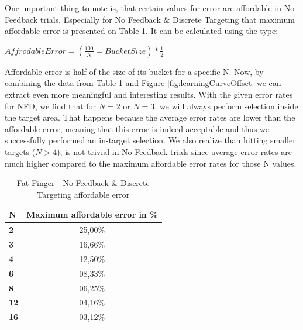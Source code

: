 One important thing to note is, that certain values for error are affordable in No Feedback trials. Especially for No Feedback \& Discrete Targeting that maximum affordable error is presented on Table \ref{tab:NFDAffordableError}. It can be calculated using the type:

 $AffrodableError = (\frac{100}{N} = BucketSize) * \frac{1}{2}$

Affordable error is half of the size of its bucket for a specific N. Now, by combining the data from Table \ref{tab:NFDAffordableError} and Figure \ref{fig:learningCurveOffset} we can extract even more meaningful and interesting results. With the given error rates for NFD, we find that for $N=2$ or $N=3$, we will always perform selection inside the target area. That happens because the average error rates are lower than the affordable error, meaning that this error is indeed acceptable and thus we successfully performed an in-target selection. We also realize than hitting smaller targets ($N>4$), is not trivial in No Feedback trials since average error rates are much higher compared to the maximum affordable error rates for those N values.



\begin{table}[H]
\centering
\begin{tabular}{l || c}
N & Maximum affordable error in \% \\
\hline \hline
\textbf{2} & 25,00\% \\
\textbf{3} & 16,66\% \\
\textbf{4} & 12,50\% \\
\textbf{6} & 08,33\% \\
\textbf{8} & 06,25\% \\
\textbf{12} & 04,16\% \\
\textbf{16} & 03,12\% 
\end{tabular}
\caption{Fat Finger - No Feedback \& Discrete Targeting affordable error}
\label{tab:NFDAffordableError}
\end{table}






